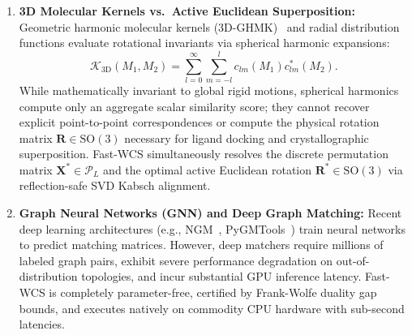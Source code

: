 \documentclass[a4paper,fleqn]{cas-dc}
\theoremstyle{thmstyleone}
\theoremstyle{thmstyletwo}
\theoremstyle{thmstylethree}
\begin{document}
\begin{enumerate}
    \item \textbf{3D Molecular Kernels vs.\ Active Euclidean Superposition:} Geometric harmonic molecular kernels (3D-GHMK)~\cite{mahe2005graph} and radial distribution functions evaluate rotational invariants via spherical harmonic expansions:
    \begin{equation}
    \mathcal{K}_{\text{3D}}(M_1, M_2) = \sum_{l=0}^\infty \sum_{m=-l}^l c_{lm}(M_1) c_{lm}^*(M_2).
    \label{eq:spherical_harmonics}
    \end{equation}
    While mathematically invariant to global rigid motions, spherical harmonics compute only an aggregate scalar similarity score; they cannot recover explicit point-to-point correspondences or compute the physical rotation matrix $\mathbf{R} \in \mathrm{SO}(3)$ necessary for ligand docking and crystallographic superposition. Fast-WCS simultaneously resolves the discrete permutation matrix $\mathbf{X}^* \in \mathcal{P}_L$ and the optimal active Euclidean rotation $\mathbf{R}^* \in \mathrm{SO}(3)$ via reflection-safe SVD Kabsch alignment.
    \item \textbf{Graph Neural Networks (GNN) and Deep Graph Matching:} Recent deep learning architectures (e.g., NGM~\cite{wang2021ngm}, PyGMTools~\cite{wang2024pygmtools}) train neural networks to predict matching matrices. However, deep matchers require millions of labeled graph pairs, exhibit severe performance degradation on out-of-distribution topologies, and incur substantial GPU inference latency. Fast-WCS is completely parameter-free, certified by Frank-Wolfe duality gap bounds, and executes natively on commodity CPU hardware with sub-second latencies.
\end{enumerate}
\end{document}
